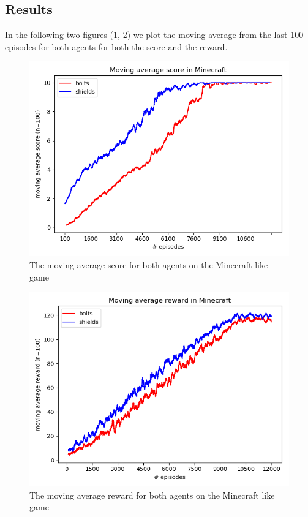 \documentclass[letterpaper]{article}
\begin{document}
\subsection{Results}
In the following two figures (\ref{fig:minecraftScore}, \ref{fig:minecraftReward}) we plot the moving average from the last 100 episodes for both agents for both the score and the reward.
\begin{figure}[ht]
    \centering
    \includegraphics[scale=0.35]{figs/score_boltz_shields_Minecraft.png}
    \caption{The moving average score for both agents on the Minecraft like game}
    \label{fig:minecraftScore}
\end{figure}
\begin{figure}[ht]
    \centering
    \includegraphics[scale=0.35]{figs/reward_boltz_shield_minecraft.png}
    \caption{The moving average reward for both agents on the Minecraft like game}
    \label{fig:minecraftReward}
\end{figure}
\end{document}

